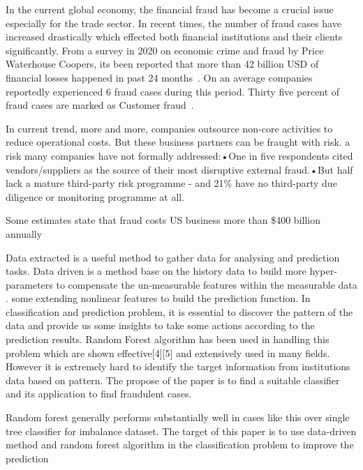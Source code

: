 
In the current global economy, the financial fraud has become a crucial issue especially for the trade sector. In recent times, the number of fraud cases have increased drastically which effected both financial institutions and their clients significantly. From a survey in 2020 on economic crime and fraud by Price Waterhouse Coopers, its been reported that more than 42 billion USD of financial losses happened in past 24 months~\cite{PwC.Crime.Survey}. On an average companies reportedly experienced 6 fraud cases during this period. Thirty five percent of fraud cases are marked as Customer fraud~\cite{PwC.Crime.Survey}.   

In current trend, more and more, companies outsource non-core activities to reduce operational costs. But these business partners can be fraught with risk. a risk many companies have not formally addressed:•One in five respondents cited vendors/suppliers as the source of their most disruptive external fraud.•But half lack a mature third-party risk programme - and 21\% have no third-party due diligence or monitoring programme  at all.










Some estimates state that fraud costs US business more than \$400 billion annually

Data extracted is a useful method to gather data for analysing and prediction tasks. Data driven is a method base on the history data to build more hyper-parameters to compensate the un-measurable features within the measurable data \cite{SMARRA20181252}. some extending nonlinear features to build the prediction function. In classification and prediction problem, it is essential to discover the pattern of the data and provide us some insights to take some actions according to the prediction results. Random Forest algorithm has been used in handling this problem which are shown effective[4][5] and extensively used in many fields. However it is extremely hard to identify the target information from institutions data based on pattern. The propose of the paper is to find a suitable classifier and its application to find fraudulent cases. 

Random forest generally performs substantially well in cases like this over single tree classifier for imbalance dataset. The target of this paper is to use data-driven method and random forest algorithm in the classification problem to improve the prediction